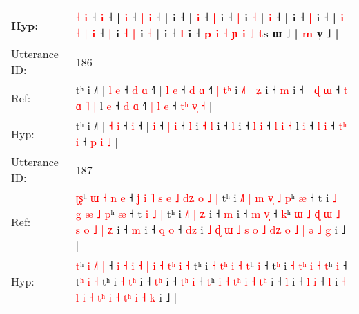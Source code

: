 \documentclass[10pt]{article}
\DeclareRobustCommand{\hl}[1]{{\textcolor{red}{#1}}}
\begin{document}
\begin{longtable}{ll}
 \\
Hyp: & \hl{˧} \hl{i} ˧\hl{}\hl{}\hl{} \hl{i} ˧ |\hl{}\hl{} \hl{i} ˧ \hl{}\hl{|} \hl{i} ˧\hl{} |\hl{}\hl{} i ˧\hl{}\hl{}\hl{}\hl{}\hl{}\hl{}\hl{} | \hl{i} ˧ \hl{|} i ˧\hl{}\hl{}\hl{}\hl{}\hl{}\hl{} \hl{|} i \hl{˧} |\hl{}\hl{} \hl{}\hl{i} ˧\hl{} |\hl{}\hl{} i ˧ \hl{|} i ˧ |\hl{}\hl{} \hl{i} \hl{˧} \hl{|} \hl{i} ˧ \hl{|} i \hl{˧} \hl{|} i \hl{˧} |\hl{}\hl{} i ˧ \hl{l} i ˧ \hl{p} \hl{}\hl{}\hl{i} \hl{˧} \hl{ɲ} \hl{i} \hl{˩} \hl{}\hl{t}s ɯ ˩ |\hl{}\hl{}\hl{}\hl{}\hl{}\hl{} \hl{m} v̩\hl{}\hl{}\hl{}\hl{}\hl{}\hl{} ˩ |
 \\
\midrule
Utterance ID: & 186 \\
Ref: & tʰ i ˩˥ | \hl{l} \hl{e} ˧\hl{ }\hl{d} \hl{ɑ} ˧\hl{˥} |\hl{ }\hl{l} \hl{e} ˧ \hl{d} \hl{ɑ} ˧\hl{˥}\hl{ }\hl{|} \hl{t}\hl{ʰ} i\hl{ }\hl{˩}\hl{˥} \hl{|} \hl{ʑ} i ˧ \hl{m} i ˧\hl{ }\hl{|} \hl{ɖ} \hl{ɯ} ˧\hl{ }\hl{t} \hl{ɑ} \hl{˥} \hl{|} l \hl{e} ˧ \hl{d} \hl{ɑ} ˧\hl{˥} \hl{|}\hl{ }\hl{l} \hl{e} ˧ \hl{t}\hl{ʰ} \hl{v}\hl{̩} \hl{˧} |
 \\
Hyp: & tʰ i ˩˥ | \hl{˧} \hl{i} ˧\hl{}\hl{} \hl{i} ˧\hl{} |\hl{}\hl{} \hl{i} ˧ \hl{|} \hl{i} ˧\hl{}\hl{}\hl{} \hl{}\hl{l} i\hl{}\hl{}\hl{} \hl{˧} \hl{l} i ˧ \hl{l} i ˧\hl{}\hl{} \hl{l} \hl{i} ˧\hl{}\hl{} \hl{l} \hl{i} \hl{˧} l \hl{i} ˧ \hl{l} \hl{i} ˧\hl{} \hl{}\hl{t}\hl{ʰ} \hl{i} ˧ \hl{}\hl{p} \hl{}\hl{i} \hl{˩} |
 \\
\midrule
Utterance ID: & 187 \\
Ref: & \hl{ʈ}\hl{ʂ}ʰ \hl{ɯ} \hl{˧}\hl{ }\hl{n} \hl{e} ˧ \hl{ʝ} \hl{i} \hl{˥} \hl{s} \hl{e} \hl{˩} \hl{d}\hl{ʑ}\hl{ }\hl{o} \hl{˩} \hl{|} tʰ i \hl{˩}\hl{˥} \hl{|}\hl{ }\hl{m} \hl{v}\hl{̩} \hl{˩} \hl{p}ʰ \hl{æ} ˧ t\hl{} i \hl{˩} \hl{|}\hl{ }\hl{g} \hl{æ} \hl{˩} \hl{p}ʰ \hl{æ} ˧ t\hl{ }\hl{i} \hl{˩} \hl{|} tʰ i \hl{˩}\hl{˥} \hl{|}\hl{ }\hl{ʑ} i ˧ \hl{}\hl{m} i ˧ \hl{m}\hl{ }\hl{v}\hl{̩} ˧ \hl{k}ʰ\hl{ }\hl{ɯ}\hl{ }\hl{˩} \hl{ɖ} \hl{ɯ} \hl{˩}\hl{ }\hl{s} \hl{o} \hl{˩} \hl{|}\hl{ }\hl{ʑ} i ˧ \hl{m} i ˧ \hl{q} \hl{o} ˧ \hl{d}\hl{z} i\hl{ }\hl{˩} \hl{ɖ} \hl{ɯ} \hl{˩} \hl{s} \hl{o}\hl{ }\hl{˩} \hl{d}\hl{ʑ} \hl{o} \hl{˩}\hl{ }\hl{|} \hl{ə} \hl{˩} \hl{g} i ˩ |
 \\
Hyp: & \hl{}\hl{t}ʰ \hl{i} \hl{}\hl{˩}\hl{˥} \hl{|} ˧ \hl{i} \hl{˧} \hl{i} \hl{˧} \hl{|} \hl{i} \hl{˧}\hl{ }\hl{t}\hl{ʰ} \hl{i} \hl{˧} tʰ i \hl{}\hl{˧} \hl{}\hl{t}\hl{ʰ} \hl{}\hl{i} \hl{˧} \hl{t}ʰ \hl{i} ˧ t\hl{ʰ} i \hl{˧} \hl{}\hl{t}\hl{ʰ} \hl{i} \hl{˧} \hl{t}ʰ \hl{i} ˧ t\hl{}\hl{ʰ} \hl{i} \hl{˧} tʰ i \hl{}\hl{˧} \hl{}\hl{t}\hl{ʰ} i ˧ \hl{t}\hl{ʰ} i ˧ \hl{t}\hl{ʰ}\hl{ }\hl{i} ˧ \hl{t}ʰ\hl{}\hl{}\hl{}\hl{} \hl{i} \hl{˧} \hl{}\hl{t}\hl{ʰ} \hl{i} \hl{˧} \hl{}\hl{t}\hl{ʰ} i ˧ \hl{l} i ˧ \hl{l} \hl{i} ˧ \hl{}\hl{l} i\hl{}\hl{} \hl{˧} \hl{l} \hl{i} \hl{˧} \hl{}\hl{t}\hl{ʰ} \hl{}\hl{i} \hl{˧} \hl{}\hl{t}\hl{ʰ} \hl{i} \hl{˧} \hl{k} i ˩ |

\end{longtable}
\end{document}
